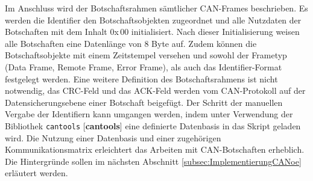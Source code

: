 Im Anschluss wird der Botschaftsrahmen sämtlicher CAN-Frames beschrieben. Es werden die Identifier den Botschaftsobjekten zugeordnet und alle Nutzdaten der Botschaften mit dem Inhalt 0x\,00 initialisiert. Nach dieser Initialisierung weisen alle Botschaften eine Datenlänge von 8 Byte auf. Zudem können die Botschaftsobjekte mit einem Zeitstempel versehen und sowohl der Frametyp (Data Frame, Remote Frame, Error Frame), als auch das Identifier-Format festgelegt werden. Eine weitere Definition des Botschaftsrahmens ist nicht notwendig, das CRC-Feld und das ACK-Feld werden vom CAN-Protokoll auf der Datensicherungsebene einer Botschaft beigefügt. Der Schritt der manuellen Vergabe der Identifiern kann umgangen werden, indem  unter Verwendung der Bibliothek \texttt{cantools} [\textbf{cantools}] eine definierte Datenbasis in das Skript geladen wird. Die Nutzung einer Datenbasis und einer zugehörigen Kommunikationsmatrix erleichtert das Arbeiten mit CAN-Botschaften erheblich. Die Hintergründe sollen im nächsten Abschnitt \ref{subsec:ImplementierungCANoe} erläutert werden. 

